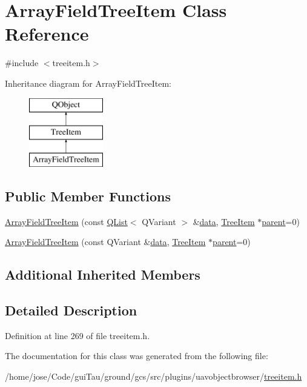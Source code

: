 \hypertarget{class_array_field_tree_item}{\section{Array\-Field\-Tree\-Item Class Reference}
\label{class_array_field_tree_item}
}


{\ttfamily \#include $<$treeitem.\-h$>$}

Inheritance diagram for Array\-Field\-Tree\-Item\-:\begin{figure}[H]
\begin{center}
\leavevmode
\includegraphics[height=3.000000cm]{class_array_field_tree_item}
\end{center}
\end{figure}
\subsection*{Public Member Functions}
\begin{DoxyCompactItemize}
\item 
\hyperlink{group___u_a_v_object_browser_plugin_gac1bacf7300e5dcaad4bb7da856408a99}{Array\-Field\-Tree\-Item} (const \hyperlink{class_q_list}{Q\-List}$<$ Q\-Variant $>$ \&\hyperlink{glext_8h_a8850df0785e6fbcc2351af3b686b8c7a}{data}, \hyperlink{class_tree_item}{Tree\-Item} $\ast$\hyperlink{group___u_a_v_object_browser_plugin_gaa3a7ba624312b6be70872634db291881}{parent}=0)
\item 
\hyperlink{group___u_a_v_object_browser_plugin_gaa011115b44f5875931af40aa93a80e97}{Array\-Field\-Tree\-Item} (const Q\-Variant \&\hyperlink{glext_8h_a8850df0785e6fbcc2351af3b686b8c7a}{data}, \hyperlink{class_tree_item}{Tree\-Item} $\ast$\hyperlink{group___u_a_v_object_browser_plugin_gaa3a7ba624312b6be70872634db291881}{parent}=0)
\end{DoxyCompactItemize}
\subsection*{Additional Inherited Members}


\subsection{Detailed Description}


Definition at line 269 of file treeitem.\-h.



The documentation for this class was generated from the following file\-:\begin{DoxyCompactItemize}
\item 
/home/jose/\-Code/gui\-Tau/ground/gcs/src/plugins/uavobjectbrowser/\hyperlink{treeitem_8h}{treeitem.\-h}\end{DoxyCompactItemize}
